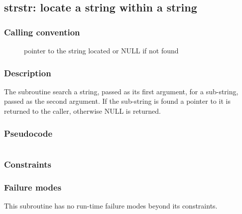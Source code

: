 \clearpage
{}
{}
\label{insn:dummy}
\subsection*{strstr: locate a string within a string}

\subsubsection*{Calling convention}

\begin{description}
\item[] pointer to the string located or NULL if not found
\end{description}

\subsubsection*{Description}

The  subroutine search a string, passed as its first
argument, for a sub-string, passed as the second argument.  If the
sub-string is found a pointer to it is returned to the caller,
otherwise NULL is returned.

\subsubsection*{Pseudocode}

\begin{verbatim}
\end{verbatim}

\subsubsection*{Constraints}

\subsubsection*{Failure modes}

This subroutine has no run-time failure modes beyond its constraints.
